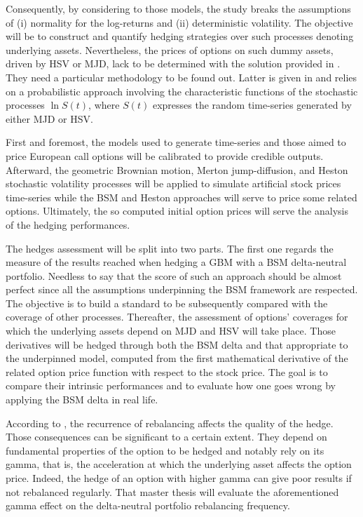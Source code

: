 \documentclass[12pt,a4paper]{report}
\begin{document}
Consequently, by considering to those models, the study breaks the assumptions of (i) normality for the log-returns and (ii) deterministic volatility.
The objective will be to construct and quantify hedging strategies over such processes denoting underlying assets.
Nevertheless, the prices of options on such dummy assets, driven by HSV or MJD, lack to be determined with the solution provided in \citet{bs}. 
They need a particular methodology to be found out. Latter is given in \citet{heston1993} and relies on a probabilistic approach involving the characteristic functions of the stochastic processes $\ln S(t)$, where $S(t)$ expresses the random time-series generated by either MJD or HSV.

First and foremost, the models used to generate time-series and those aimed to price European call options will be calibrated to provide credible outputs.
Afterward, the geometric Brownian motion, Merton jump-diffusion, and Heston stochastic volatility processes will be applied to simulate artificial stock prices time-series while the BSM and Heston approaches will serve to price some related options.
Ultimately, the so computed initial option prices will serve the analysis of the hedging performances.

The hedges assessment will be split into two parts. 
The first one regards the measure of the results reached when hedging a GBM with a BSM delta-neutral portfolio.  Needless to say that the score of such an approach should be almost perfect since all the assumptions underpinning the BSM framework are respected.
The objective is to build a standard to be subsequently compared with the coverage of other processes.
Thereafter, the assessment of options' coverages for which the underlying assets depend on MJD and HSV will take place.
Those derivatives will be hedged through both the BSM delta and that appropriate to the underpinned model, computed from the first mathematical derivative of the related option price function with respect to the stock price.
The goal is to compare their intrinsic performances and to evaluate how one goes wrong by applying the BSM delta in real life. 

According to \citet{shreve}, the recurrence of rebalancing affects the quality of the hedge. 
Those consequences can be significant to a certain extent.
They depend on fundamental properties of the option to be hedged and notably rely on its gamma, that is, the acceleration at which the underlying asset affects the option price.
Indeed, the hedge of an option with higher gamma can give poor results if not rebalanced regularly.
That master thesis will evaluate the aforementioned gamma effect on the delta-neutral portfolio rebalancing frequency.
\end{document}
